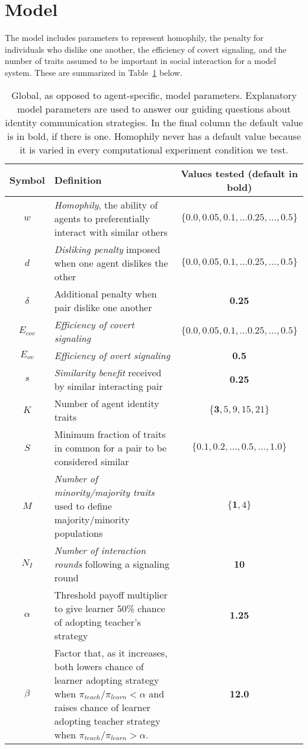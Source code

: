 \documentclass[11pt,letterpaper]{article}
\begin{document}
\section{Model}

The model includes parameters to represent homophily, the penalty for 
individuals who dislike one another, the efficiency of covert signaling, and the
number of traits assumed to be important in social interaction for a model system.
These are summarized in Table~\ref{tab:params} below.

\vspace{1em}
\begin{table}[H]
  \centering
  \begin{tabular}{cp{3.5in}c}
    Symbol & Definition & Values tested (default in bold)  \\
    \toprule 
    $w$      & \emph{Homophily}, the ability of agents to preferentially interact with similar others & $\{0.0, 0.05, 0.1,\ldots \mathbf{0.25}, \ldots, 0.5\}$\\
    $d$      & \emph{Disliking penalty} imposed when one agent dislikes the other & $\{0.0, 0.05, 0.1,\ldots \mathbf{0.25}, \ldots, 0.5\}$ \\
    $\delta$ & Additional penalty when pair dislike one another & \textbf{0.25} \\
    $E_{cov}$ & \emph{Efficiency of covert signaling} & $\{0.0, 0.05, 0.1,\ldots \mathbf{0.25}, \ldots, 0.5\}$ \\
    $E_{ov}$ & \emph{Efficiency of overt signaling} & \textbf{0.5} \\
    $s$      & \emph{Similarity benefit} received by similar interacting pair & \textbf{0.25} \\
    $K$      & Number of agent identity traits & $\{\mathbf{3}, 5, 9, 15, 21\}$ \\
    $S$      & Minimum fraction of traits in common for a pair to be considered similar & 
      $\{0.1, 0.2, \ldots, \mathbf{0.5}, \ldots, 1.0\}$\\
    $M$      & \emph{Number of minority/majority traits} used to define majority/minority populations & $\{\mathbf{1}, 4\}$\\
    $N_I$      & \emph{Number of interaction rounds} following a signaling round & \textbf{10} \\
    $\alpha$ & Threshold payoff multiplier to give learner 50\% chance of 
        adopting teacher's strategy & \textbf{1.25}\\
    $\beta$  & Factor that, as it increases, both lowers chance of learner 
               adopting strategy when $\pi_{teach}/\pi_{learn} < \alpha$ and
               raises chance of learner adopting teacher strategy when 
               $\pi_{teach}/\pi_{learn} > \alpha$. & \textbf{12.0}
  \end{tabular}
  \caption{Global, as opposed to agent-specific, model parameters. 
  Explanatory model parameters are used to answer
  our guiding questions about identity communication strategies. In the final
  column the default value is in bold, if there is one. Homophily never has a
  default value because it is varied in every computational experiment
  condition we test.}
  \label{tab:params}
\end{table}
\end{document}
